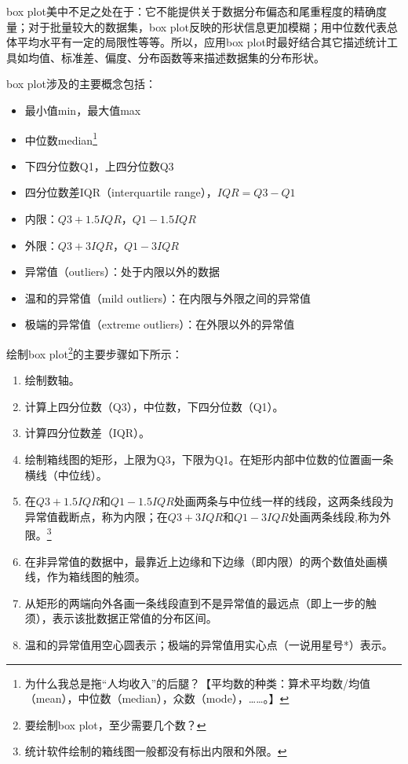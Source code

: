 \documentclass[11pt,a4paper,twoside]{book}
\begin{document}
box plot美中不足之处在于：它不能提供关于数据分布偏态和尾重程度的精确度量；对于批量较大的数据集，box plot反映的形状信息更加模糊；用中位数代表总体平均水平有一定的局限性等等。所以，应用box plot时最好结合其它描述统计工具如均值、标准差、偏度、分布函数等来描述数据集的分布形状。

box plot涉及的主要概念包括：
\begin{itemize}
  \item 最小值min，最大值max
  \item 中位数median\footnote{为什么我总是拖“人均收入”的后腿？【平均数的种类：算术平均数/均值（mean），中位数（median），众数（mode），……。】}
  \item 下四分位数Q1，上四分位数Q3
  \item 四分位数差IQR（interquartile range），$IQR = Q3-Q1$
  \item 内限：$Q3 + 1.5IQR$，$Q1 - 1.5IQR$
  \item 外限：$Q3 + 3IQR$，$Q1 - 3IQR$
  \item 异常值（outliers）：处于内限以外的数据
  \item 温和的异常值（mild outliers）：在内限与外限之间的异常值
  \item 极端的异常值（extreme outliers）：在外限以外的异常值
\end{itemize}

绘制box plot\footnote{要绘制box plot，至少需要几个数？}的主要步骤如下所示：
\begin{enumerate}
  \item 绘制数轴。
  \item 计算上四分位数（Q3），中位数，下四分位数（Q1）。
  \item 计算四分位数差（IQR）。
  \item 绘制箱线图的矩形，上限为Q3，下限为Q1。在矩形内部中位数的位置画一条横线（中位线）。
  \item 在$Q3 + 1.5IQR$和$Q1 - 1.5IQR$处画两条与中位线一样的线段，这两条线段为异常值截断点，称为内限；在$Q3 +3 IQR$和$Q1 - 3IQR$处画两条线段,称为外限。\footnote{统计软件绘制的箱线图一般都没有标出内限和外限。}
  \item 在非异常值的数据中，最靠近上边缘和下边缘（即内限）的两个数值处画横线，作为箱线图的触须。
  \item 从矩形的两端向外各画一条线段直到不是异常值的最远点（即上一步的触须），表示该批数据正常值的分布区间。
  \item 温和的异常值用空心圆表示；极端的异常值用实心点（一说用星号*）表示。
\end{enumerate}
\end{document}
